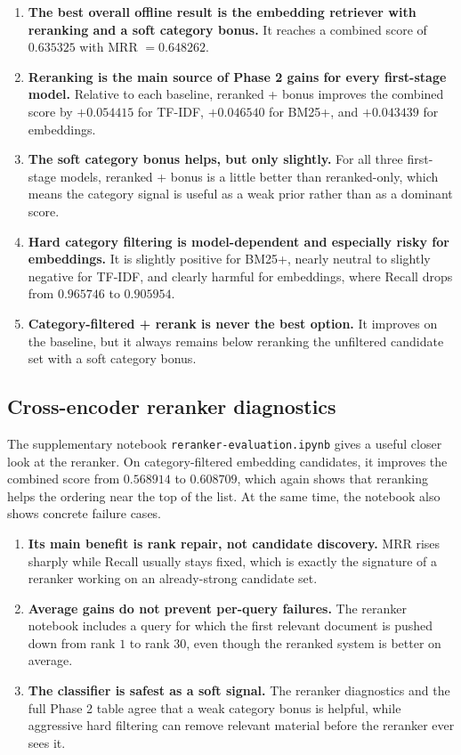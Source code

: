 \documentclass[11pt,a4paper]{article}
\begin{document}
\begin{enumerate}
    \item \textbf{The best overall offline result is the embedding retriever with reranking and a soft category bonus.} It reaches a combined score of \(\mathbf{0.635325}\) with MRR \(=0.648262\).
    \item \textbf{Reranking is the main source of Phase 2 gains for every first-stage model.} Relative to each baseline, reranked + bonus improves the combined score by \(+0.054415\) for TF-IDF, \(+0.046540\) for BM25+, and \(+0.043439\) for embeddings.
    \item \textbf{The soft category bonus helps, but only slightly.} For all three first-stage models, reranked + bonus is a little better than reranked-only, which means the category signal is useful as a weak prior rather than as a dominant score.
    \item \textbf{Hard category filtering is model-dependent and especially risky for embeddings.} It is slightly positive for BM25+, nearly neutral to slightly negative for TF-IDF, and clearly harmful for embeddings, where Recall drops from \(0.965746\) to \(0.905954\).
    \item \textbf{Category-filtered + rerank is never the best option.} It improves on the baseline, but it always remains below reranking the unfiltered candidate set with a soft category bonus.
\end{enumerate}

\subsection{Cross-encoder reranker diagnostics}

The supplementary notebook \texttt{reranker-evaluation.ipynb} gives a useful closer look at the reranker. On category-filtered embedding candidates, it improves the combined score from \(0.568914\) to \(0.608709\), which again shows that reranking helps the ordering near the top of the list. At the same time, the notebook also shows concrete failure cases.

\begin{enumerate}
    \item \textbf{Its main benefit is rank repair, not candidate discovery.} MRR rises sharply while Recall usually stays fixed, which is exactly the signature of a reranker working on an already-strong candidate set.
    \item \textbf{Average gains do not prevent per-query failures.} The reranker notebook includes a query for which the first relevant document is pushed down from rank \(1\) to rank \(30\), even though the reranked system is better on average.
    \item \textbf{The classifier is safest as a soft signal.} The reranker diagnostics and the full Phase 2 table agree that a weak category bonus is helpful, while aggressive hard filtering can remove relevant material before the reranker ever sees it.
\end{enumerate}
\end{document}
